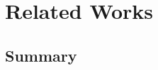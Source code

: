 \chapter{Related Works}
\label{relatedWork}
\blindtext[2]

\blinddescription

\blindmathtrue

\blindtext

\section{Summary}
\blindtext